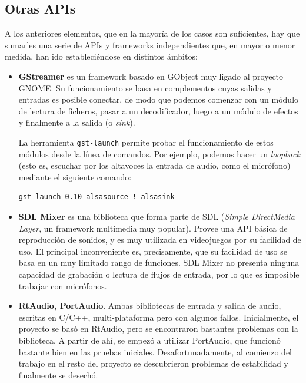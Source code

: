 \subsection{Otras APIs}

A los anteriores elementos, que en la mayoría de los casos son suficientes, hay
que sumarles una serie de APIs y frameworks independientes que, en mayor o menor
medida, han ido estableciéndose en distintos ámbitos: 

\begin{itemize}
\item \textbf{GStreamer} es un framework basado en GObject muy ligado al
  proyecto GNOME. Su funcionamiento se basa en complementos cuyas salidas y
  entradas es posible conectar, de modo que podemos comenzar con un módulo de
  lectura de ficheros, pasar a un decodificador, luego a un módulo de efectos y
  finalmente a la salida (o \textit{sink}). 

  La herramienta \texttt{gst-launch} permite probar el funcionamiento de estos
  módulos desde la línea de comandos. Por ejemplo, podemos hacer un
  \textit{loopback} (esto es, escuchar por los altavoces la entrada de audio,
  como el micrófono) mediante el siguiente comando:

\begin{verbatim}
gst-launch-0.10 alsasource ! alsasink
\end{verbatim}

\item \textbf{SDL Mixer} es una biblioteca que forma parte de SDL
  (\textit{Simple DirectMedia Layer}, un framework multimedia muy
  popular). Provee una API básica de reproducción de sonidos, y es muy utilizada
  en videojuegos por su facilidad de uso. El principal inconveniente es,
  precisamente, que su facilidad de uso se basa en un muy limitado rango de
  funciones. SDL Mixer no presenta ninguna capacidad de grabación o lectura de
  flujos de entrada, por lo que es imposible trabajar con micrófonos.

\item \textbf{RtAudio, PortAudio}. Ambas bibliotecas de entrada y salida de
  audio, escritas en C/C++, multi-plataforma pero con algunos
  fallos. Inicialmente, el proyecto se basó en RtAudio, pero se encontraron
  bastantes problemas con la biblioteca. A partir de ahí, se empezó a utilizar
  PortAudio, que funcionó bastante bien en las pruebas
  iniciales. Desafortunadamente, al comienzo del trabajo en el resto del
  proyecto se descubrieron problemas de estabilidad y finalmente se desechó.

\end{itemize}
